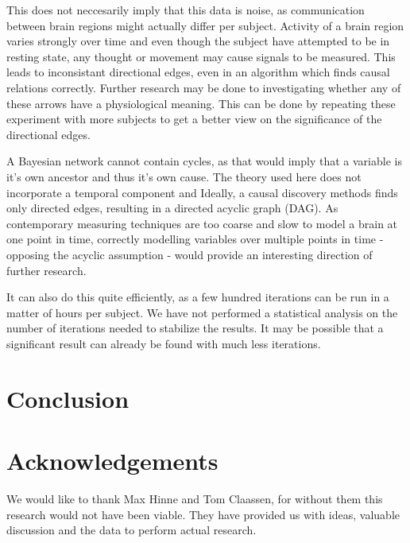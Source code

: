 \documentclass[a4paper, 10pt, english, onecolumn]{article}
\begin{document}
This does not neccesarily imply that this data is noise, as communication between brain regions might actually differ per subject.
Activity of a brain region varies strongly over time and even though the subject have attempted to be in resting state, any thought or movement may cause signals to be measured.
This leads to inconsistant directional edges, even in an algorithm which finds causal relations correctly.
Further research may be done to investigating whether any of these arrows have a physiological meaning.
This can be done by repeating these experiment with more subjects to get a better view on the significance of the directional edges.

A Bayesian network cannot contain cycles, as that would imply that a variable is it's own ancestor and thus it's own cause.
The theory used here does not incorporate a temporal component and 
Ideally, a causal discovery methods finds only directed edges, resulting in a directed acyclic graph (DAG).
As contemporary measuring techniques are too coarse and slow to model a brain at one point in time, correctly modelling variables over multiple points in time - opposing the acyclic assumption - would provide an interesting direction of further research.

It can also do this quite efficiently, as a few hundred iterations can be run in a matter of hours per subject.
We have not performed a statistical analysis on the number of iterations needed to stabilize the results.
It may be possible that a significant result can already be found with much less iterations.



\section{Conclusion}


\section{Acknowledgements}
We would like to thank Max Hinne and Tom Claassen, for without them this research would not have been viable.
They have provided us with ideas, valuable discussion and the data to perform actual research.

{}

\end{document}
